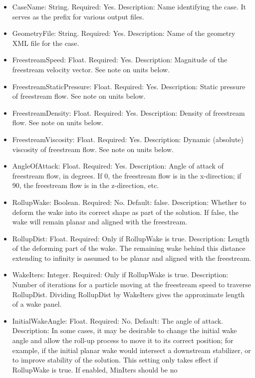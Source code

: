 \documentclass[11pt]{article}
\begin{document}
\begin{itemize}
	\item CaseName: String. Required: Yes. Description: Name identifying the
		case. It serves as the prefix for various output files.
	\item GeometryFile: String. Required: Yes. Description: Name of the geometry
		XML file for the case.
	\item FreestreamSpeed: Float. Required: Yes. Description: Magnitude of the
		freestream velocity vector. See note on units below.
	\item FreestreamStaticPressure: Float. Required: Yes. Description: Static
		pressure of freestream flow. See note on units below.
	\item FreestreamDensity: Float. Required: Yes. Description: Density of
		freestream flow. See note on units below.
	\item FreestreamViscosity: Float. Required: Yes. Description: Dynamic
		(absolute) viscosity of freestream flow. See note on units below.
	\item AngleOfAttack: Float. Required: Yes. Description: Angle of attack of
		freestream flow, in degrees. If 0, the freestream flow is in the
		x-direction; if 90, the freestream flow is in the z-direction, etc.
	\item RollupWake: Boolean. Required: No. Default: false. Description: Whether to deform
		the wake into its correct shape as part of the solution. If false, the
		wake will remain planar and aligned with the freestream.
	\item RollupDist: Float. Required: Only if RollupWake is true. Description:
		Length of the deforming part of the wake. The remaining wake behind this
		distance extending to infinity is assumed to be planar and aligned with
		the freestream.
	\item WakeIters: Integer. Required: Only if RollupWake is true. Description:
		Number of iterations for a particle moving at the freestream speed to
		traverse RollupDist. Dividing RollupDist by WakeIters gives the
		approximate length of a wake panel.
	\item InitialWakeAngle: Float. Required: No. Default: The angle of attack.
		Description: In some cases, it may be desirable to change the initial wake angle and
		allow the roll-up process to move it to its correct position; for
		example, if the initial planar wake would intersect a downstream
		stabilizer, or to improve stability of the solution. This setting only
		takes effect if RollupWake is true. If enabled, MinIters should be no

\end{itemize}
\end{document}
